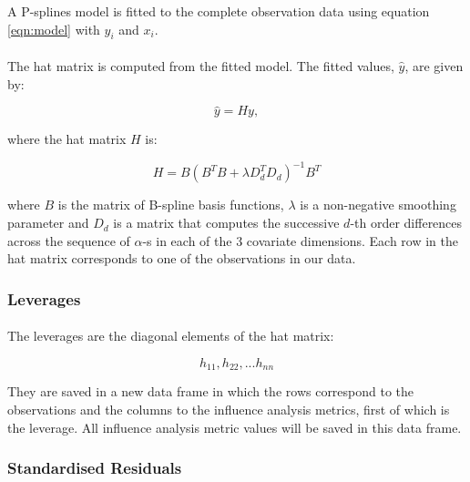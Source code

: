 \documentclass{article}
\begin{document}
A P-splines model is fitted to the complete observation data using equation \ref{eqn:model} with $y_i$ and $x_i$.

\paragraph{}

The hat matrix is computed from the fitted model. The fitted values, $\hat{y}$, are given by:

\begin{equation}
    \hat{y} = Hy,
\end{equation}

where the hat matrix $H$ is:

\begin{equation}
    H = B(B^TB + \lambda D_d^TD_d)^{-1}B^T
\end{equation}

where $B$ is the matrix of B-spline basis functions, $\lambda$ is a non-negative smoothing parameter and $D_d$ is a matrix that computes the successive $d$-th order differences across the sequence of $\alpha$-s in each of the 3 covariate dimensions. Each row in the hat matrix corresponds to one of the observations in our data. 

\subsubsection{Leverages}
\paragraph{}

The leverages are the diagonal elements of the hat matrix:

\begin{equation}
    h_{11}, h_{22}, ... h_{nn}
\end{equation}

They are saved in a new data frame in which the rows correspond to the observations and the columns to the influence analysis metrics, first of which is the leverage. All influence analysis metric values will be saved in this data frame.

\subsubsection{Standardised Residuals}
\paragraph{}
\end{document}

